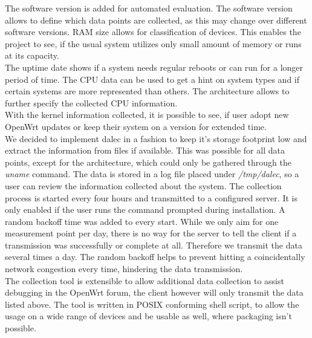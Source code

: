     The software version is added for automated evaluation. The software version allows to define which data points are collected, as this may change over different software versions. RAM size allows for classification of devices. This enables the project to see, if the usual system utilizes only small amount of memory or runs at its capacity.\\
    The uptime date shows if a system needs regular reboots or can run for a longer period of time. The CPU data can be used to get a hint on system types and if certain systems are more represented than others. The architecture allows to further specify the collected CPU information.\\
    With the kernel information collected, it is possible to see, if user adopt new OpenWrt updates or keep their system on a version for extended time.\\
    
    We decided to implement dalec in a fashion to keep it's storage footprint low and extract the information from files if available. This was possible for all data points, except for the architecture, which could only be gathered through the \textit{uname} command. The data is stored in a log file placed under \textit{/tmp/dalec}, so a user can review the information collected about the system. The collection process is started every four hours and transmitted to a configured server. It is only enabled if the user runs the command prompted during installation. A random backoff time was added to every start. While we only aim for one measurement point per day, there is no way for the server to tell the client if a transmission was successfully or complete at all. Therefore we transmit the data several times a day. The random backoff helps to prevent hitting a coincidentally network congestion every time, hindering the data transmission.\\
    The collection tool is extensible to allow additional data collection to assist debugging in the OpenWrt forum, the client however will only transmit the data listed above. The tool is written in POSIX conforming shell script, to allow the usage on a wide range of devices and be usable as well, where packaging isn't possible.
%
